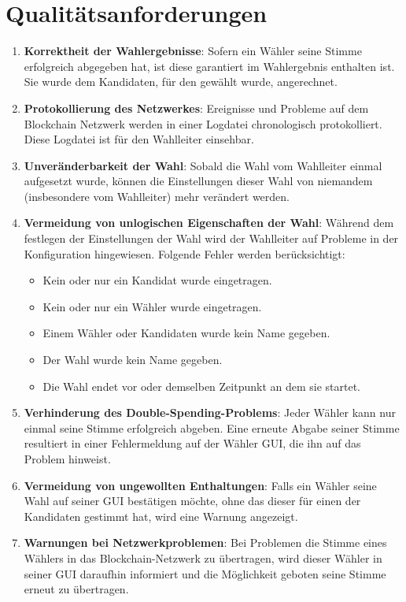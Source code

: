 \documentclass[parskip=full,11pt,twoside]{scrartcl}
\begin{document}
\section{Qualitätsanforderungen}
\begin{enumerate}
	\item \textbf{Korrektheit der Wahlergebnisse}: Sofern ein Wähler seine Stimme erfolgreich abgegeben hat, ist diese garantiert im Wahlergebnis enthalten ist. Sie wurde dem Kandidaten, für den gewählt wurde, angerechnet.
	\item \textbf{Protokollierung des Netzwerkes}: Ereignisse und Probleme auf dem Blockchain Netzwerk werden in einer Logdatei chronologisch protokolliert. Diese Logdatei ist für den Wahlleiter einsehbar.
	\item \textbf{Unveränderbarkeit der Wahl}: Sobald die Wahl vom Wahlleiter einmal aufgesetzt wurde, können die Einstellungen dieser Wahl von niemandem (insbesondere vom Wahlleiter) mehr verändert werden.
	\item \textbf{Vermeidung von unlogischen Eigenschaften der Wahl}: Während dem festlegen der Einstellungen der Wahl wird der Wahlleiter auf Probleme in der Konfiguration hingewiesen. Folgende Fehler werden berücksichtigt:
		\begin{itemize}
			\item Kein oder nur ein Kandidat wurde eingetragen.
			\item Kein oder nur ein Wähler wurde eingetragen.
			\item Einem Wähler oder Kandidaten wurde kein Name gegeben.
			\item Der Wahl wurde kein Name gegeben.
			\item Die Wahl endet vor oder demselben Zeitpunkt an dem sie startet.
		\end{itemize}
	\item \textbf{Verhinderung des Double-Spending-Problems}: Jeder Wähler kann nur einmal seine Stimme erfolgreich abgeben. Eine erneute Abgabe seiner Stimme resultiert in einer Fehlermeldung auf der Wähler GUI, die ihn auf das Problem hinweist.
	\item \textbf{Vermeidung von ungewollten Enthaltungen}: Falls ein Wähler seine Wahl auf seiner GUI bestätigen möchte, ohne das dieser für einen der Kandidaten gestimmt hat, wird eine Warnung angezeigt.
	\item \textbf{Warnungen bei Netzwerkproblemen}: Bei Problemen die Stimme eines Wählers in das Blockchain-Netzwerk zu übertragen, wird dieser Wähler in seiner GUI daraufhin informiert und die Möglichkeit geboten seine Stimme erneut zu übertragen. 
\end{enumerate}
\end{document}
